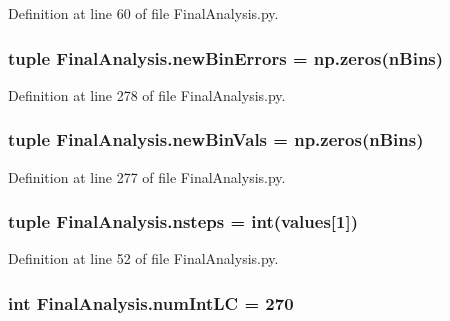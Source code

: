 Definition at line 60 of file Final\-Analysis.\-py.

\hypertarget{namespace_final_analysis_ac7e5340352eec13fbd15cb78ce1d7c13}{
\subsubsection[{new\-Bin\-Errors}]{\setlength{\rightskip}{0pt plus 5cm}tuple Final\-Analysis.\-new\-Bin\-Errors = np.\-zeros({\bf n\-Bins})}}\label{namespace_final_analysis_ac7e5340352eec13fbd15cb78ce1d7c13}


Definition at line 278 of file Final\-Analysis.\-py.

\hypertarget{namespace_final_analysis_af73c4fbd388650228620f11e8128489b}{
\subsubsection[{new\-Bin\-Vals}]{\setlength{\rightskip}{0pt plus 5cm}tuple Final\-Analysis.\-new\-Bin\-Vals = np.\-zeros({\bf n\-Bins})}}\label{namespace_final_analysis_af73c4fbd388650228620f11e8128489b}


Definition at line 277 of file Final\-Analysis.\-py.

\hypertarget{namespace_final_analysis_a11e023099f2819c75bd7ecb02c7671c3}{
\subsubsection[{nsteps}]{\setlength{\rightskip}{0pt plus 5cm}tuple Final\-Analysis.\-nsteps = int({\bf values}\mbox{[}1\mbox{]})}}\label{namespace_final_analysis_a11e023099f2819c75bd7ecb02c7671c3}


Definition at line 52 of file Final\-Analysis.\-py.

\hypertarget{namespace_final_analysis_a9481028e551e6a7d0abf48c81f22cf86}{
\subsubsection[{num\-Int\-L\-C}]{\setlength{\rightskip}{0pt plus 5cm}int Final\-Analysis.\-num\-Int\-L\-C = 270}}\label{namespace_final_analysis_a9481028e551e6a7d0abf48c81f22cf86}


